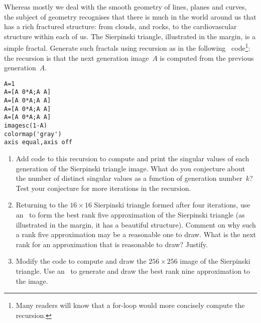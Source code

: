 \begin{exercise} \label{ex:siertri} 
Whereas mostly we deal with the smooth geometry of lines, planes and curves, 
the subject of  geometry recognises that there is much in the world around us that has a rich fractured structure: from clouds, and rocks, to the cardiovascular structure within each of us.
\marginpar{}
The Sierpinski triangle, illustrated in the margin, is a simple fractal.
Generate such fractals using recursion as in the following \script\ code\footnote{Many readers will know that a for-loop would more concisely compute the recursion.}:
the recursion is that the next generation image~\(A\) is computed from the previous generation~\(A\).
\begin{verbatim}
A=1
A=[A 0*A;A A]
A=[A 0*A;A A]
A=[A 0*A;A A]
A=[A 0*A;A A]
imagesc(1-A)
colormap('gray')
axis equal,axis off
\end{verbatim}
\setbox\ajrqrbox\hbox{}%
\marginpar{\usebox{\ajrqrbox\\[2ex]}}%
\begin{enumerate}
\item Add code to this recursion to compute and print the singular values of each generation of the Sierpinski triangle image.
What do you conjecture about the number of distinct singular values as a function of generation number~\(k\)?
Test your conjecture for more iterations in the recursion.

\item Returning to the \(16\times16\) Sierpinski triangle formed after four iterations, use an \svd\ to form the best rank five approximation of the Sierpinski triangle (as illustrated in the margin, it has a beautiful structure).  
\marginpar{}%
Comment on why such a rank five approximation may be a reasonable one to draw.  
What is the next rank for an approximation that is reasonable to draw?  Justify.

\item Modify the code to compute and draw the \(256\times256\) image of the Sierpinski triangle.
Use an \svd\ to generate and draw the best rank nine approximation to the image.
\end{enumerate}
\end{exercise}




